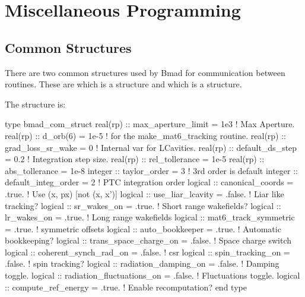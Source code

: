 \chapter{Miscellaneous Programming}

\section{Common Structures}
\label{s:common_struct}


There are two common structures used by Bmad for communication between
routines. These are  which is a 
structure and  which is a 
structure.

The  structure is:
\begin{example}
  type bmad_com_struct
    real(rp) :: max_aperture_limit = 1e3       ! Max Aperture.
    real(rp) :: d_orb(6)           = 1e-5      ! for the make_mat6_tracking routine.
    real(rp) :: grad_loss_sr_wake  = 0         ! Internal var for LCavities.
    real(rp) :: default_ds_step    = 0.2       ! Integration step size.  
    real(rp) :: rel_tollerance = 1e-5
    real(rp) :: abs_tollerance = 1e-8
    integer :: taylor_order = 3                ! 3rd order is default
    integer :: default_integ_order = 2         ! PTC integration order
    logical :: canonical_coords = .true.       ! Use (x, px) [not (x, x')]
    logical :: use_liar_lcavity = .false.      ! Liar like tracking?
    logical :: sr_wakes_on = .true.            ! Short range wakefields?
    logical :: lr_wakes_on = .true.            ! Long range wakefields
    logical :: mat6_track_symmetric = .true.   ! symmetric offsets
    logical :: auto_bookkeeper = .true.        ! Automatic bookkeeping?
    logical :: trans_space_charge_on = .false. ! Space charge switch
    logical :: coherent_synch_rad_on = .false. ! csr 
    logical :: spin_tracking_on = .false.      ! spin tracking?
    logical :: radiation_damping_on = .false.       ! Damping toggle.
    logical :: radiation_fluctuations_on = .false.  ! Fluctuations toggle.
    logical :: compute_ref_energy = .true.          ! Enable recomputation?
  end type
\end{example}


